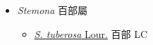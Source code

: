 
  \begin{itemize}
 \item[] \textit{Stemona} 百部屬
                                
  \begin{itemize}
        \item[] \href{http://www.theplantlist.org/tpl1.1/search?q=Stemona+tuberosa}{\textit{S. tuberosa} Lour.}   百部   LC
  \end{itemize}
  \end{itemize}
